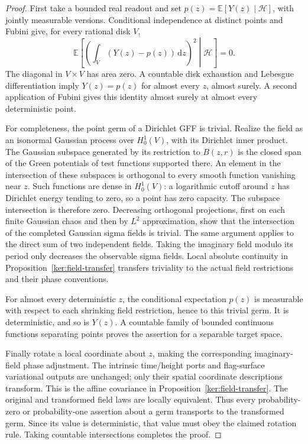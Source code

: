 \documentclass[11pt]{article}
\numberwithin{equation}{section}
\theoremstyle{definition}
\theoremstyle{remark}
\newcommand{\EE}{\mathbb E}
\newcommand{\dd}{\mathrm d}
\newcommand{\1}{\mathbf 1}
\begin{document}
\begin{proof}
First take a bounded real readout and set
\(p(z)=\EE[Y(z)\mid\mathcal H]\), with jointly measurable versions.
Conditional independence at distinct points and Fubini give, for
every rational disk \(V\),
\[
 \EE\left[\left(\int_V(Y(z)-p(z))\,\dd z\right)^2
              \middle|\mathcal H\right]=0.
\]
The diagonal in \(V\times V\) has area zero.  A countable disk
exhaustion and Lebesgue differentiation imply
\(Y(z)=p(z)\) for almost every \(z\), almost surely.  A second
application of Fubini gives this identity almost surely at almost
every deterministic point.

For completeness, the point germ of a Dirichlet GFF is trivial.
Realize the field as an isonormal Gaussian process over
\(H^1_0(V)\), with its Dirichlet inner product.  The Gaussian
subspace generated by its restriction to \(B(z,r)\) is the closed
span of the Green potentials of test functions supported there.
An element in the intersection of these subspaces is orthogonal to
every smooth function vanishing near \(z\).  Such functions are
dense in \(H^1_0(V)\): a logarithmic cutoff around \(z\) has
Dirichlet energy tending to zero, so a point has zero capacity.
The subspace intersection is therefore zero.  Decreasing orthogonal
projections, first on each finite Gaussian chaos and then by
\(L^2\) approximation, show that the intersection of the completed
Gaussian sigma fields is trivial.  The same argument applies to the
direct sum of two independent fields.  Taking the imaginary field
modulo its period only decreases the observable sigma fields.
Local absolute continuity in Proposition~\ref{ker:field-transfer}
transfers triviality to the actual field restrictions and their phase
conventions.

For almost every deterministic \(z\), the conditional expectation
\(p(z)\) is measurable with respect to each shrinking field
restriction, hence to this trivial germ.  It is deterministic, and
so is \(Y(z)\).  A countable family of bounded continuous functions
separating points proves the assertion for a separable target space.

Finally rotate a local coordinate about \(z\), making the corresponding
imaginary-field phase adjustment.  The intrinsic time/height ports
and flag-surface variational outputs are unchanged; only their
spatial coordinate descriptions transform.  This is the affine
covariance in Proposition~\ref{ker:field-transfer}.  The original
and transformed field laws are locally equivalent.  Thus every
probability-zero or probability-one assertion about a germ transports
to the transformed germ.  Since its value is deterministic, that
value must obey the claimed rotation rule.  Taking countable
intersections completes the proof.
\end{proof}
\end{document}
